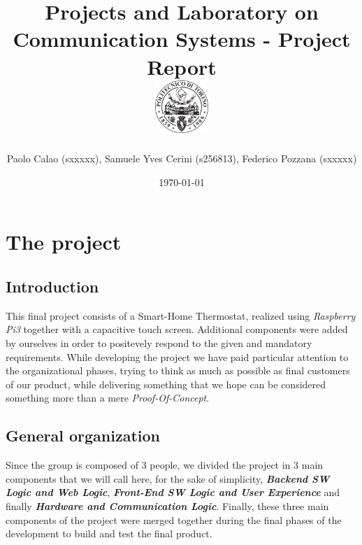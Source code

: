 \documentclass[a4paper]{article}
\begin{document}
    \title{
        Projects and Laboratory on Communication Systems - Project Report \\[0.5cm]
        \includegraphics[width=0.15\textwidth]{PoliLogo.png}%
    }
    \author{Paolo Calao (sxxxxx), Samuele Yves Cerini (s256813), Federico Pozzana (sxxxxx)}

    \date{\today}
    \maketitle
    
    
    \tableofcontents    
    
    \section{The project}

        \subsection{Introduction}
        This final project consists of a Smart-Home Thermostat, realized using \emph{Raspberry Pi3} together with a capacitive touch screen.
        Additional components were added by ourselves in order to positevely respond to the given and mandatory requirements.
        While developing the project we have paid particular attention to the organizational phases, trying to think as much as possible as final customers of our product, while delivering something that we hope can be considered something more than a mere \emph{Proof-Of-Concept}.
            
        \subsection{General organization}
        Since the group is composed of 3 people, we divided the project in 3 main components that we will call here, for the sake of simplicity, \textbf{\emph{Backend SW Logic and Web Logic}}, \textbf{\emph{Front-End SW Logic and User Experience}} and finally \textbf{\emph{Hardware and Communication Logic}}.
        Finally, these three main components of the project were merged together during the final phases of the development to build and test the final product.
\end{document}
